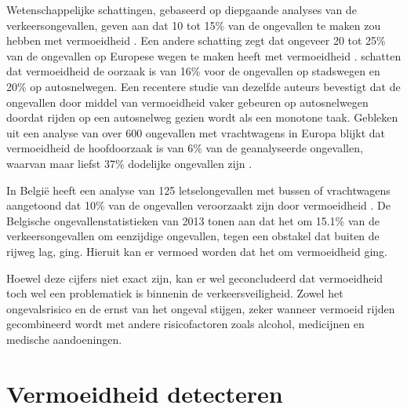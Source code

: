 Wetenschappelijke schattingen, gebaseerd op diepgaande analyses van de verkeersongevallen, geven aan dat 10 tot 15\% van de ongevallen te maken zou hebben met vermoeidheid \autocite{VanSchagen2003}. Een andere schatting zegt dat ongeveer 20 tot 25\% van de ongevallen op Europese wegen te maken heeft met vermoeidheid \autocite{Akerstedt2013}. \textcite{Horne1995} schatten dat vermoeidheid de oorzaak is van 16\% voor de ongevallen op stadswegen en 20\% op autosnelwegen. Een recentere studie van dezelfde auteurs \autocite{Horne1999} bevestigt dat de ongevallen door middel van vermoeidheid vaker gebeuren op autosnelwegen doordat rijden op een autosnelweg gezien wordt als een monotone taak. 
Gebleken uit een analyse van over 600 ongevallen met vrachtwagens in Europa blijkt dat vermoeidheid de hoofdoorzaak is van 6\% van de geanalyseerde ongevallen, waarvan maar liefst 37\% dodelijke ongevallen zijn \autocite{IRU2007}.

In België heeft een analyse van 125 letselongevallen met bussen of vrachtwagens aangetoond dat 10\% van de ongevallen veroorzaakt zijn door vermoeidheid \autocite{Herdewyn2010}. De Belgische ongevallenstatistieken van 2013 tonen aan dat het om 15.1\% van de verkeersongevallen om eenzijdige ongevallen, tegen een obstakel dat buiten de rijweg lag, ging. Hieruit kan er vermoed worden dat het om vermoeidheid ging.

Hoewel deze cijfers niet exact zijn, kan er wel geconcludeerd dat vermoeidheid toch wel een problematiek is binnenin de verkeersveiligheid. Zowel het ongevalsrisico en de ernst van het ongeval stijgen, zeker wanneer vermoeid rijden gecombineerd wordt met andere risicofactoren zoals alcohol, medicijnen en medische aandoeningen.

\section{Vermoeidheid detecteren}
